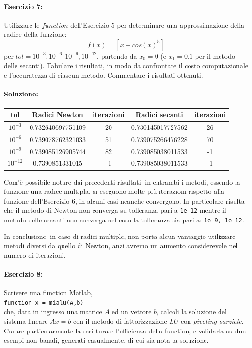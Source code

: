 \documentclass[12pt]{article}
\begin{document}
\paragraph{Esercizio 7:}Utilizzare le \(function\) dell'Esercizio 5 per determinare una approssimazione della radice della funzione:
$$f(x)=[x-cos(x)^5]$$
per \(tol = 10^{-3}, 10^{-6}, 10^{-9}, 10^{-12}\), partendo da \(x_0 = 0\) (e \(x_1 = 0.1\) per il metodo delle secanti). 
Tabulare i risultati, in modo da confrontare il costo computazionale e l’accuratezza di ciascun metodo. Commentare i risultati ottenuti.\pagebreak
\paragraph{Soluzione:}
\begin{center}
    \begin{tabular}{|| c || c | c || c | c||} 
        \hline
        tol & Radici Newton & iterazioni & Radici secanti & iterazioni\\
        \hline
        \(10^{-3}\) & 0.732640697751109 & 20 & 0.730145017727562 & 26\\
        \hline
        \(10^{-6}\) & 0.739078762321033 & 51 & 0.739075266476228 & 70\\
        \hline
        \(10^{-9}\) & 0.739085126905744 & 82 & 0.739085038011533 & -1\\
        \hline
        \(10^{-12}\) & 0.7390851331015 & -1 & 0.739085038011533 & -1\\
        \hline
    \end{tabular}
\end{center}
Com'è possibile notare dai precedenti risultati, in entrambi i metodi, essendo la funzione una radice multipla, si eseguono molte più iterazioni rispetto alla funzione 
dell'Esercizio 6, in alcuni casi neanche convergono.
In particolare risulta che il metodo di Newton non converga su tolleranza pari a \texttt{1e-12} mentre il metodo delle secanti non converga nel caso la tolleranza sia pari a:
\texttt{1e-9, 1e-12}.

In conclusione, in caso di radici multiple, non porta alcun vantaggio utilizzare metodi diversi da quello di Newton, anzi avremo un aumento considerevole nel numero di iterazioni.
\paragraph{Esercizio 8:}Scrivere una function Matlab,\\
\texttt{function x = mialu(A,b)}\\
che, data in ingresso una matrice \(A\) ed un vettore \(b\), calcoli la soluzione del sistema lineare \(Ax = b\) con il metodo di fattorizzazione \(LU\) 
con \textit{pivoting parziale}. Curare particolarmente la scrittura e l’efficienza della function, e validarla su due esempi non banali, generati casualmente, 
di cui sia nota la soluzione.
\end{document}
